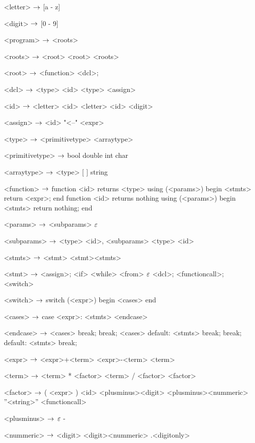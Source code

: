 



\begin{grammar}
<letter> $\rightarrow$ [a - z]
	\alt [A - Z]

<digit> $\rightarrow$ [0 - 9]

<program> $\rightarrow$ <roots>

<roots> $\rightarrow$ <root>
\alt <root> <roots>

<root> $\rightarrow$ <function>
\alt <dcl>;

<dcl> $\rightarrow$ <type> <id>
\alt <type> <assign>

<id> $\rightarrow$ <letter>
	\alt<id> <letter>
	\alt<id> <digit>

<assign>  $\rightarrow$ <id> "<--" <expr>

<type> $\rightarrow$ <primitivetype>
\alt <arraytype>

<primitivetype> $\rightarrow$ bool
\alt double
\alt int
\alt char

<arraytype> $\rightarrow$ <type> [ ]
\alt string

<function> $\rightarrow$  function <id> returns <type> using (<params>)
begin
	<stmts>
	return <expr>;
end
\alt function <id> returns nothing using (<params>)
begin
	<stmts>
	return nothing;
end

<params> $\rightarrow$ <subparams>
	\alt $\varepsilon$

<subparams> $\rightarrow$ <type> <id>, <subparams>
\alt <type> <id>

<stmts> $\rightarrow$ <stmt>
	\alt <stmt><stmts>

<stmt> $\rightarrow$ <assign>;
	\alt <if>
	\alt <while>
	\alt <from>
	\alt $\varepsilon$
	\alt <dcl>;
	\alt <functioncall>;
	\alt <switch>

<switch> $\rightarrow$ switch (<expr>)
		begin
			<cases>
		end

<cases> $\rightarrow$ case <expr>:
			<stmts>
		<endcase>
		
<endcase> $\rightarrow$ <cases>
		\alt break;
		\alt break;
		<cases>
		\alt default:
			<stmts>
			break;
		\alt break;
		default:
			<stmts>
			break;

<expr> $\rightarrow$ <expr>+<term>
	\alt<expr>-<term>
	\alt<term>

<term> $\rightarrow$ <term> * <factor>
	\alt <term> / <factor>
	\alt <factor>

<factor> $\rightarrow$ ( <expr> )
	\alt <id>
	\alt <plusminus><digit>
	\alt <plusminus><nummeric>
	\alt ''<string>''
	\alt <functioncall> 

<plusminus> $\rightarrow$ $\varepsilon$
	\alt -

<nummeric> $\rightarrow$ <digit>
	\alt <digit><nummeric>
	\alt .<digitonly>


\end{grammar}
